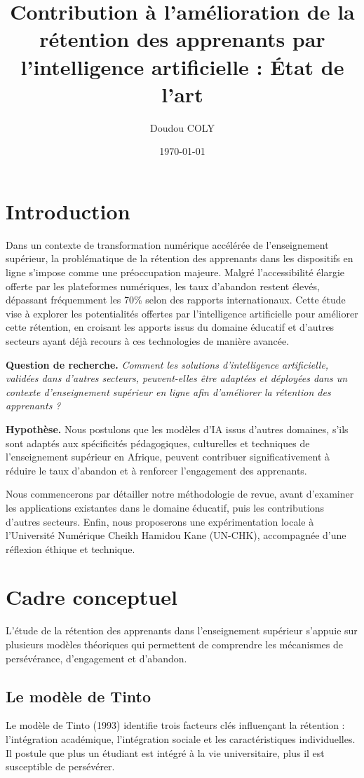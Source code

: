 \documentclass[12pt]{article}
\title{Contribution à l’amélioration de la rétention des apprenants par l’intelligence artificielle : État de l’art}
\author{Doudou COLY}
\date{\today}
\begin{document}
\maketitle

\section{Introduction}
Dans un contexte de transformation numérique accélérée de l’enseignement supérieur, la problématique de la rétention des apprenants dans les dispositifs en ligne s’impose comme une préoccupation majeure. Malgré l’accessibilité élargie offerte par les plateformes numériques, les taux d’abandon restent élevés, dépassant fréquemment les 70\% selon des rapports internationaux. Cette étude vise à explorer les potentialités offertes par l’intelligence artificielle pour améliorer cette rétention, en croisant les apports issus du domaine éducatif et d’autres secteurs ayant déjà recours à ces technologies de manière avancée.

\textbf{Question de recherche.} \emph{Comment les solutions d’intelligence artificielle, validées dans d’autres secteurs, peuvent-elles être adaptées et déployées dans un contexte d’enseignement supérieur en ligne afin d’améliorer la rétention des apprenants ?}

\textbf{Hypothèse.} Nous postulons que les modèles d’IA issus d’autres domaines, s’ils sont adaptés aux spécificités pédagogiques, culturelles et techniques de l’enseignement supérieur en Afrique, peuvent contribuer significativement à réduire le taux d’abandon et à renforcer l’engagement des apprenants.

Nous commencerons par détailler notre méthodologie de revue, avant d’examiner les applications existantes dans le domaine éducatif, puis les contributions d’autres secteurs. Enfin, nous proposerons une expérimentation locale à l’Université Numérique Cheikh Hamidou Kane (UN-CHK), accompagnée d’une réflexion éthique et technique.

\section*{Cadre conceptuel}
L’étude de la rétention des apprenants dans l’enseignement supérieur s’appuie sur plusieurs modèles théoriques qui permettent de comprendre les mécanismes de persévérance, d’engagement et d’abandon.

\subsection*{Le modèle de Tinto}
Le modèle de Tinto (1993) identifie trois facteurs clés influençant la rétention : l'intégration académique, l'intégration sociale et les caractéristiques individuelles. Il postule que plus un étudiant est intégré à la vie universitaire, plus il est susceptible de persévérer.
\end{document}
